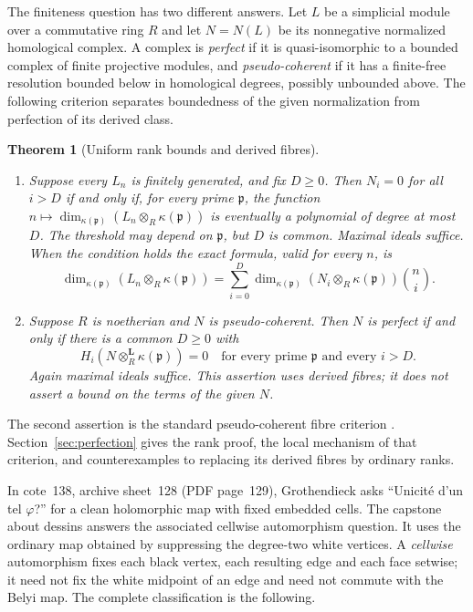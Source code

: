 \documentclass[11pt,a4paper]{article}
\newtheorem{theorem}{Theorem}[section]
\theoremstyle{definition}
\begin{document}
The finiteness question has two different answers. Let $L$ be a
simplicial module over a commutative ring $R$ and let $N=N(L)$ be
its nonnegative normalized homological complex. A complex is
\emph{perfect} if it is quasi-isomorphic to a bounded complex of
finite projective modules, and \emph{pseudo-coherent} if it has a
finite-free resolution bounded below in homological degrees, possibly
unbounded above. The following criterion separates boundedness of
the given normalization from perfection of its derived class.
\begin{theorem}[Uniform rank bounds and derived fibres]\label{thm:rank-perfect}
\begin{enumerate}
\item Suppose every $L_n$ is finitely generated, and fix $D\ge0$.
Then $N_i=0$ for all $i>D$ if and only if, for every prime
$\mathfrak p$, the function
$n\mapsto\dim_{\kappa(\mathfrak p)}(L_n\otimes_R\kappa(\mathfrak p))$
is eventually a polynomial of degree at most $D$. The threshold may
depend on $\mathfrak p$, but $D$ is common. Maximal ideals suffice.
When the condition holds the exact formula, valid for every $n$, is
\[
 \dim_{\kappa(\mathfrak p)}(L_n\otimes_R\kappa(\mathfrak p))
 =\sum_{i=0}^D
 \dim_{\kappa(\mathfrak p)}(N_i\otimes_R\kappa(\mathfrak p))\binom ni.
\]
\item Suppose $R$ is noetherian and $N$ is pseudo-coherent.
Then $N$ is perfect if and only if there is a common $D\ge0$ with
\[
 H_i(N\otimes_R^{\mathbf L}\kappa(\mathfrak p))=0
 \quad\text{for every prime }\mathfrak p\text{ and every }i>D.
\]
Again maximal ideals suffice. This assertion uses derived fibres;
it does not assert a bound on the terms of the given $N$.
\end{enumerate}
\end{theorem}
The second assertion is the standard pseudo-coherent fibre criterion
\cite[Lemma~15.79.2, Tag~068V]{StacksFibres}. Section~\ref{sec:perfection}
gives the rank proof, the local mechanism of that criterion, and
counterexamples to replacing its derived fibres by ordinary ranks.

In cote~138, archive sheet~128 (PDF page~129), Grothendieck asks ``Unicit\'e d'un tel $\varphi$?'' for a clean holomorphic map with fixed embedded cells. The capstone about dessins answers the associated cellwise automorphism question. It uses the ordinary map obtained by suppressing the degree-two white vertices. A \emph{cellwise} automorphism fixes each black vertex, each resulting edge and each face setwise; it need not fix the white midpoint of an edge and need not commute with the Belyi map. The complete classification is the following.
\end{document}
